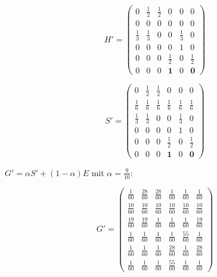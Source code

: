 \documentclass[a4paper]{scrartcl}
\def \blattnr {4}
\begin{document}
\begin{enumerate}[label=\bfseries \blattnr.\arabic*]
    \begin{minipage}{0.5\textwidth}
      \begin{equation*}
	H' = \begin{pmatrix}
	     0 & \frac12 & \frac12 & 0 & 0 & 0 \\
	     0 & 0 & 0 & 0 & 0 & 0 \\
	     \frac13 & \frac13 & 0 & 0 & \frac13 & 0 \\
	     0 & 0 & 0 & 0 & 1 & 0 \\
	     0 & 0 & 0 & \frac12 & 0 & \frac12 \\
	     0 & 0 & 0 & \textbf{1} & 0 & \textbf{0}
	    \end{pmatrix}
     \end{equation*}
    \end{minipage}
    \begin{minipage}{0.5\textwidth}
     \begin{equation*}
	S' = \begin{pmatrix}
	     0 & \frac12 & \frac12 & 0 & 0 & 0 \\
	     \frac16 & \frac16 & \frac16 & \frac16 & \frac16 & \frac16 \\
	     \frac13 & \frac13 & 0 & 0 & \frac13 & 0 \\
	     0 & 0 & 0 & 0 & 1 & 0 \\
	     0 & 0 & 0 & \frac12 & 0 & \frac12 \\
	     0 & 0 & 0 & \textbf{1} & 0 & \textbf{0}
	    \end{pmatrix}
     \end{equation*}
    \end{minipage}
    
    $G' = \alpha S' + (1-\alpha)E$ mit $\alpha = \frac 9{10}$:
    
    \begin{equation*}
	G' = \begin{pmatrix}
	     \frac{1}{60} & \frac{28}{60} & \frac{28}{60} & \frac{1}{60} & \frac{1}{60} & \frac{1}{60} \\
	     \frac{10}{60} & \frac{10}{60} & \frac{10}{60} & \frac{10}{60} & \frac{10}{60} & \frac{10}{60} \\
	     \frac{19}{60} & \frac{19}{60} & \frac{1}{60} & \frac{1}{60} & \frac{1}{60} & \frac{19}{60} \\
	     \frac{1}{60} & \frac{1}{60} & \frac{1}{60} & \frac{1}{60} & \frac{55}{60} & \frac{1}{60} \\
	     \frac{1}{60} & \frac{1}{60} & \frac{1}{60} & \frac{28}{60} & \frac{1}{60} & \frac{28}{60} \\
	     \frac{1}{60} & \frac{1}{60} & \frac{1}{60} & \frac{55}{60} & \frac{1}{60} & \frac{1}{60}
	    \end{pmatrix}
     \end{equation*}
     

\end{enumerate}
\end{document}

